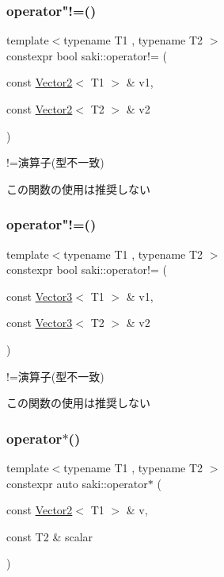 \subsubsection{\texorpdfstring{operator"!=()}{operator!=()}\hspace{0.1cm}{\footnotesize\ttfamily [3/4]}}
{\footnotesize\ttfamily template$<$typename T1 , typename T2 $>$ \\
constexpr bool saki\+::operator!= (\begin{DoxyParamCaption}\item[{const \mbox{\hyperlink{classsaki_1_1_vector2}{Vector2}}$<$ T1 $>$ \&}]{v1,  }\item[{const \mbox{\hyperlink{classsaki_1_1_vector2}{Vector2}}$<$ T2 $>$ \&}]{v2 }\end{DoxyParamCaption})}



!=演算子(型不一致) 

この関数の使用は推奨しない \mbox{\label{namespacesaki_a26df5bd85b044f8556c4e258479b54f7}} 
\subsubsection{\texorpdfstring{operator"!=()}{operator!=()}\hspace{0.1cm}{\footnotesize\ttfamily [4/4]}}
{\footnotesize\ttfamily template$<$typename T1 , typename T2 $>$ \\
constexpr bool saki\+::operator!= (\begin{DoxyParamCaption}\item[{const \mbox{\hyperlink{classsaki_1_1_vector3}{Vector3}}$<$ T1 $>$ \&}]{v1,  }\item[{const \mbox{\hyperlink{classsaki_1_1_vector3}{Vector3}}$<$ T2 $>$ \&}]{v2 }\end{DoxyParamCaption})}



!=演算子(型不一致) 

この関数の使用は推奨しない \mbox{\label{namespacesaki_a9b267db283c1b65ccf046a239443f5dd}} 
\subsubsection{\texorpdfstring{operator$\ast$()}{operator*()}\hspace{0.1cm}{\footnotesize\ttfamily [1/4]}}
{\footnotesize\ttfamily template$<$typename T1 , typename T2 $>$ \\
constexpr auto saki\+::operator$\ast$ (\begin{DoxyParamCaption}\item[{const \mbox{\hyperlink{classsaki_1_1_vector2}{Vector2}}$<$ T1 $>$ \&}]{v,  }\item[{const T2 \&}]{scalar }\end{DoxyParamCaption})}



